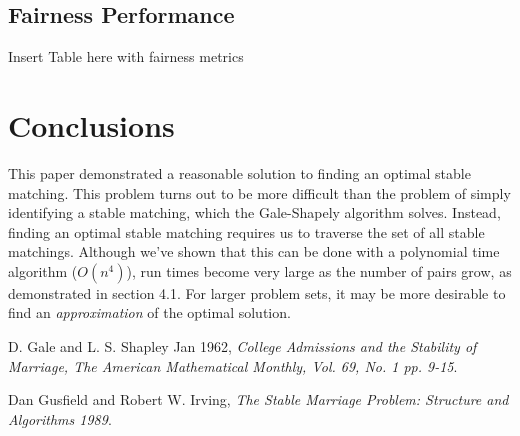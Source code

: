 \documentclass[a4paper]{article}
\begin{document}
\subsection{Fairness Performance}

Insert Table here with fairness metrics

\section{Conclusions}
This paper demonstrated a reasonable solution to finding an optimal stable matching. This problem turns out to be more difficult than the problem of simply identifying a stable matching, which the Gale-Shapely algorithm solves. Instead, finding an optimal stable matching requires us to traverse the set of all stable matchings. Although we've shown that this can be done with a polynomial time algorithm ($O(n^4)$), run times become very large as the number of pairs grow, as demonstrated in section 4.1. For larger problem sets, it may be more desirable to find an \emph{approximation} of the optimal solution.

\begin{thebibliography}{9}
  D. Gale and L. S. Shapley Jan 1962,
  \emph{College Admissions and the Stability of Marriage, The American Mathematical Monthly, Vol. 69, No. 1 pp. 9-15}.

  Dan Gusfield and Robert W. Irving,
  \emph{The Stable Marriage Problem: Structure and Algorithms 1989}.

\end{thebibliography}
\end{document}
